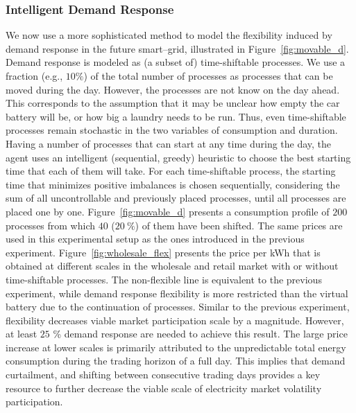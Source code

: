 \documentclass[conference]{IEEEtran}
\begin{document}
\subsubsection{Intelligent Demand Response}

We now use a more sophisticated method to model the flexibility induced by demand response in the future smart--grid, illustrated in Figure~\ref{fig:movable_d}. Demand response is modeled as (a subset of) time-shiftable processes. We use a fraction (e.g., $10\%$) of the total number of processes as processes that can be moved during the day. However, the processes are not know on the day ahead. This corresponds to the assumption that it may be unclear how empty the car battery will be, or how big a laundry needs to be run. Thus, even time-shiftable processes remain stochastic in the two variables of consumption and duration.
Having a number of processes that can start at any time during the day, the agent uses an intelligent (sequential, greedy) heuristic to choose the best starting time that each of them will take. For each time-shiftable process, the starting time that minimizes positive imbalances is chosen sequentially, considering the sum of all uncontrollable and previously placed processes, until all processes are placed one by one. Figure~\ref{fig:movable_d} presents a consumption profile of $200$ processes from which $40$ ($20~\%$) of them have been shifted. The same prices are used in this experimental setup as the ones introduced in the previous experiment. Figure~\ref{fig:wholesale_flex} presents the price per kWh that is obtained at different scales in the wholesale and retail market with or without time-shiftable processes. The non-flexible line is equivalent to the previous experiment, while demand response flexibility is more restricted than the virtual battery due to the continuation of processes. Similar to the previous experiment, flexibility decreases viable market participation scale by a magnitude. However, at least $25$ \% demand response are needed to achieve this result.
The large price increase at lower scales is primarily attributed to the unpredictable total energy consumption during the trading horizon of a full day. This implies that demand curtailment, and shifting between consecutive trading days provides a key resource to further decrease the viable scale of electricity market volatility participation.
\end{document}
